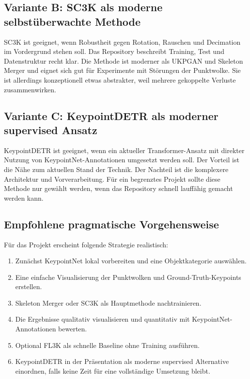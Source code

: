 \documentclass[11pt,a4paper]{article}
\begin{document}
\subsection{Variante B: SC3K als moderne selbstüberwachte Methode}

SC3K ist geeignet, wenn Robustheit gegen Rotation, Rauschen und Decimation im Vordergrund stehen soll. Das Repository beschreibt Training, Test und Datenstruktur recht klar. Die Methode ist moderner als UKPGAN und Skeleton Merger und eignet sich gut für Experimente mit Störungen der Punktwolke. Sie ist allerdings konzeptionell etwas abstrakter, weil mehrere gekoppelte Verluste zusammenwirken.

\subsection{Variante C: KeypointDETR als moderner supervised Ansatz}

KeypointDETR ist geeignet, wenn ein aktueller Transformer-Ansatz mit direkter Nutzung von KeypointNet-Annotationen umgesetzt werden soll. Der Vorteil ist die Nähe zum aktuellen Stand der Technik. Der Nachteil ist die komplexere Architektur und Vorverarbeitung. Für ein begrenztes Projekt sollte diese Methode nur gewählt werden, wenn das Repository schnell lauffähig gemacht werden kann.

\subsection{Empfohlene pragmatische Vorgehensweise}

Für das Projekt erscheint folgende Strategie realistisch:

\begin{enumerate}
    \item Zunächst KeypointNet lokal vorbereiten und eine Objektkategorie auswählen.
    \item Eine einfache Visualisierung der Punktwolken und Ground-Truth-Keypoints erstellen.
    \item Skeleton Merger oder SC3K als Hauptmethode nachtrainieren.
    \item Die Ergebnisse qualitativ visualisieren und quantitativ mit KeypointNet-Annotationen bewerten.
    \item Optional FL3K als schnelle Baseline ohne Training ausführen.
    \item KeypointDETR in der Präsentation als moderne supervised Alternative einordnen, falls keine Zeit für eine vollständige Umsetzung bleibt.
\end{enumerate}
\end{document}
